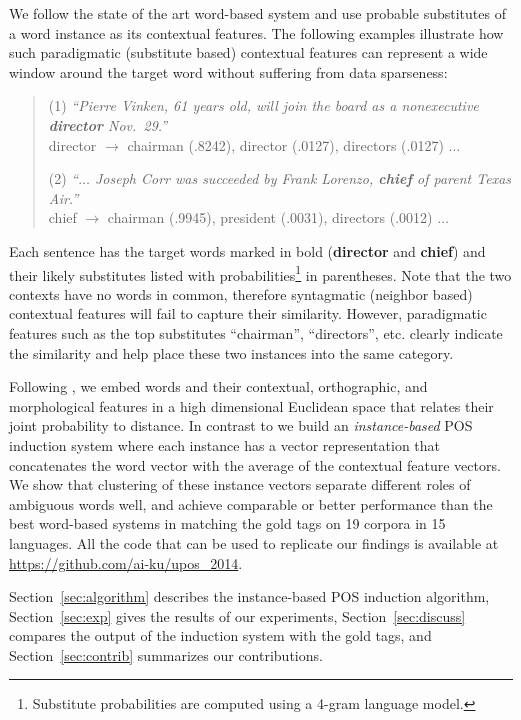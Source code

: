 We follow the state of the art word-based system
\cite{yatbaz-sert-yuret:2012:EMNLP-CoNLL} and use probable substitutes
of a word instance as its contextual features.  The following examples
illustrate how such paradigmatic (substitute based) contextual
features can represent a wide window around the target word without
suffering from data sparseness:

\begin{quotation}
(1) {\em ``Pierre Vinken, 61 years old, will join the board
  as a nonexecutive {\bf director} Nov.~29.''} 
\\ director $\rightarrow$ chairman
(.8242), director (.0127), directors (.0127) $\ldots$

(2) {\em ``$\ldots$ Joseph Corr was succeeded by Frank
  Lorenzo, {\bf chief} of parent Texas Air.''} 
\\ chief $\rightarrow$ chairman
(.9945), president (.0031), directors (.0012) $\ldots$
\end{quotation}

Each sentence has the target words marked in bold ({\bf director} and
{\bf chief}) and their likely substitutes listed with
probabilities\footnote{Substitute probabilities are computed using a
  4-gram language model.} in parentheses.  Note that the two contexts
have no words in common, therefore syntagmatic (neighbor based)
contextual features will fail to capture their similarity.  However,
paradigmatic features such as the top substitutes ``chairman'',
``directors'', etc.  clearly indicate the similarity and help place
these two instances into the same category.

Following \cite{globerson2007euclidean}, we embed words and their
contextual, orthographic, and morphological features in a high
dimensional Euclidean space that relates their joint probability to
distance.  In contrast to \cite{yatbaz-sert-yuret:2012:EMNLP-CoNLL} we
build an {\em instance-based} POS induction system where each instance
has a vector representation that concatenates the word vector with the
average of the contextual feature vectors.  We show that clustering of
these instance vectors separate different roles of ambiguous words
well, and achieve comparable or better performance than the best
word-based systems in matching the gold tags on 19 corpora in 15
languages.  All the code that can be used to replicate our findings is
available at \url{https://github.com/ai-ku/upos_2014}.

Section~\ref{sec:algorithm} describes the instance-based POS induction
algorithm, Section~\ref{sec:exp} gives the results of our experiments,
Section~\ref{sec:discuss} compares the output of the induction system
with the gold tags, and Section~\ref{sec:contrib} summarizes our
contributions.
